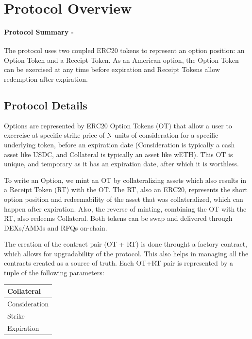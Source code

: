 \documentclass[%
 reprint,
 amsmath,amssymb,
 aps,
 prl,
floatfix,
]{revtex4-2}
\begin{document}
\section{Protocol Overview}
\paragraph*{Protocol Summary -}
The protocol uses two coupled ERC20 tokens to represent an option position: an Option Token and a Receipt Token. As an American option, the Option Token can be exercised at any time before expiration and Receipt Tokens allow redemption after expiration. 

\subsection{Protocol Details}
Options are represented by ERC20 Option Tokens (OT) that allow a user to excercise at specific strike price of N units of consideration for a specific underlying token, before an expiration date (Consideration is typically a cash asset like USDC, and Collateral is typically an asset like wETH).
This OT is unique, and temporary as it has an expiration date, after which it is worthless. 

To write an Option, we mint an OT by collateralizing assets which also results in a Receipt Token (RT) with the OT. 
The RT, also an ERC20, represents the short option position and redeemability of the asset that was collateralized, which can happen after expiration.
Also, the reverse of minting, combining the OT with the RT, also redeems Collateral.
Both tokens can be swap and delivered through DEXs/AMMs and RFQs on-chain.

The creation of the contract pair (OT + RT) is done throught a factory contract, which allows for upgradability of the protocol. 
This also helps in managing all the contracts created as a source of truth.
Each OT+RT pair is represented by a tuple of the following parameters:

\begin{table}[ht]
\centering
\begin{tabular}{|p{2.5cm} |}
\hline
Collateral \\
\hline
Consideration \\
\hline
Strike \\
\hline
Expiration \\
\hline
\end{tabular}
\end{table}
\end{document}
